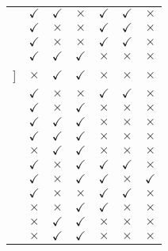 \begin{table}[h]
\begin{tabular}{p{5cm}cccccc}
\cite{Ahmadi-2011} & $\checkmark$  &  $\checkmark$ &  $\times$ & $\checkmark$ & $\checkmark$ & $\times$\\
\cite{Deb2012} &  $\checkmark$ &  $\times$ &  $\times$ & $\checkmark$ & $\checkmark$ & $\times$\\
\cite{Basu-11} &  $\checkmark$ &  $\times$ &  $\times$ & $\checkmark$ & $\checkmark$ & $\times$\\
\cite{Berrios-2011} &  $\checkmark$ &  $\checkmark$ &  $\checkmark$ & $\times$ & $\times$ & $\times$\\
\cite{Habi-2011}] &  $\times$ &  $\checkmark$ &  $\checkmark$ & $\times$ & $\times$ & $\times$\\
\cite{Mazur-2009} &  $\checkmark$ &  $\times$ &  $\times$ & $\checkmark$ & $\checkmark$ & $\times$\\
\cite{Moon-2011} &  $\checkmark$ &  $\times$ &  $\checkmark$ & $\times$ & $\times$ & $\times$\\
\cite{Liu2010} &  $\checkmark$ &  $\checkmark$ &  $\checkmark$ & $\times$ & $\times$ & $\times$\\
\cite{Bare-2005} &  $\checkmark$ &  $\checkmark$ &  $\checkmark$ & $\times$ & $\times$ & $\times$\\
\cite{Mastacan-2005} &  $\times$ &  $\checkmark$ &  $\checkmark$ & $\times$ & $\times$ & $\times$\\
\cite{Rashidi-2011} &  $\checkmark$ &  $\times$ &  $\checkmark$ & $\checkmark$ & $\checkmark$ & $\times$\\
\cite{Suresh-2011} &  $\checkmark$ &  $\times$ &  $\checkmark$ & $\checkmark$ & $\times$ & $\checkmark$\\
\cite{Sayyaadi-2011} &  $\checkmark$ &  $\times$ &  $\times$ & $\checkmark$ & $\checkmark$ & $\times$\\
\cite{Saez-2007} &  $\times$ &  $\times$ &  $\checkmark$ & $\checkmark$ & $\times$ & $\times$\\
\cite{Kwun-2007} &  $\times$ &  $\checkmark$ &  $\checkmark$ & $\times$ & $\times$ & $\times$\\
\cite{Tamiru-2009} &  $\times$ &  $\checkmark$ &  $\checkmark$ & $\times$ & $\times$ & $\times$\\
 \bottomrule
 \end{tabular}
\end{table}


